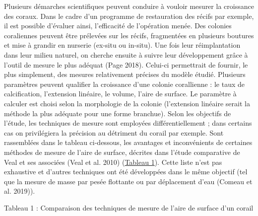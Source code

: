 \documentclass[]{article}
\begin{document}
Plusieurs démarches scientifiques peuvent conduire à vouloir mesurer la
croissance des coraux. Dans le cadre d'un programme de restauration des
récifs par exemple, il est possible d'évaluer ainsi, l'efficacité de
l'opération menée. Des colonies coraliennes peuvent être prélevées sur
les récifs, fragmentées en plusieurs boutures et mise à grandir en
nurserie (ex-situ ou in-situ). Une fois leur réimplantation dans leur
milieu naturel, on cherche ensuite à suivre leur développement grâce à
l'outil de mesure le plus adéquat (Page 2018). Celui-ci permettrait de
fournir, le plus simplement, des mesures relativement précises du modèle
étudié. Plusieurs paramètres peuvent qualifier la croissance d'une
colonie corallienne : le taux de calcification, l'extension linéaire, le
volume, l'aire de surface. Le paramètre à calculer est choisi selon la
morphologie de la colonie (l'extension linéaire serait la méthode la
plus adéquate pour une forme branchue). Selon les objectifs de l'étude,
les techniques de mesure sont employées différentiellement ; dans
certains cas on privilégiera la précision au détriment du corail par
exemple. Sont rassemblées dans le tableau ci-dessous, les avantages et
inconvénients de certaines méthodes de mesure de l'aire de surface,
décrites dans l'étude comparative de Veal et ses associées (Veal et al.
2010) (\protect\hyperlink{fig:Tableauux5cux25201}{Tableau 1}). Cette
liste n'est pas exhaustive et d'autres techniques ont été développées
dans le même objectif (tel que la mesure de masse par pesée flottante ou
par déplacement d'eau (Comeau et al. 2019)).

Tableau 1 : Comparaison des techniques de mesure de l'aire de surface
d'un corail
\end{document}

